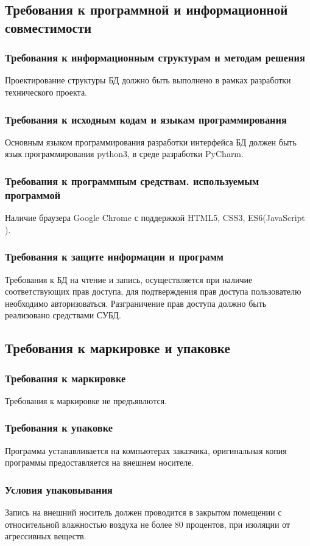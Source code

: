   \subsection{Требования к программной и информационной совместимости}
    \subsubsection{Требования к информационным структурам и методам решения}
      Проектирование структуры БД должно быть выполнено в рамках разработки технического проекта.
    \subsubsection{Требования к исходным кодам и языкам программирования}
      Основным языком программирования разработки интерфейса БД должен быть язык программирования python3, в среде разработки PyCharm.
    \subsubsection{Требования к программным средствам. используемым программой}
      Наличие браузера Google Chrome с поддержкой HTML5, CSS3, ES6(JavaScript ).
    \subsubsection{Требования к защите информации и программ}
      Требования к БД на чтение и запись, осуществляется при наличие соответствующих прав доступа, для подтверждения прав доступа пользователю необходимо авторизоваться. Разграничение прав доступа должно быть реализовано средствами СУБД.
  \subsection{Требования к маркировке и упаковке}
    \subsubsection{Требования к маркировке}
      Требования к маркировке не предъявлются.
    \subsubsection{Требования к упаковке}
      Программа устанавливается на компьютерах заказчика, оригинальная копия программы предоставляется на внешнем носителе.
    \subsubsection{Условия упаковывания}
      Запись на внешний носитель должен проводится в закрытом помещении с относительной влажностью воздуха не более 80 процентов, при изоляции от агрессивных веществ.
